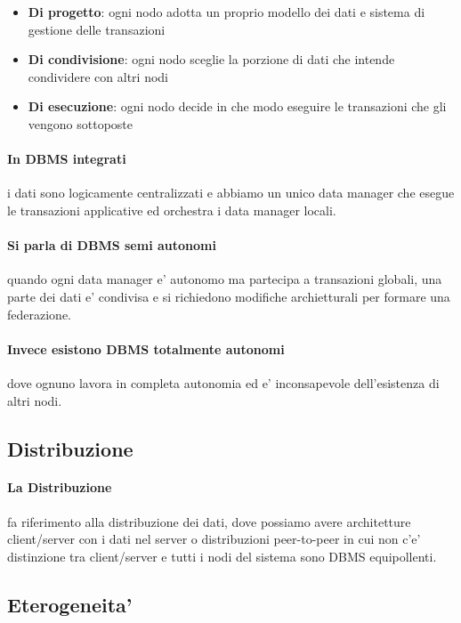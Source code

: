 \begin{itemize}
  \item \textbf{Di progetto}: ogni nodo adotta un proprio modello dei dati e sistema di gestione delle transazioni
  \item \textbf{Di condivisione}: ogni nodo sceglie la porzione di dati che intende condividere con altri nodi
  \item \textbf{Di esecuzione}: ogni nodo decide in che modo eseguire le transazioni che gli vengono sottoposte
\end{itemize}

\paragraph{In DBMS integrati} i dati sono logicamente centralizzati e abbiamo un unico data manager che esegue le transazioni applicative ed orchestra i data manager locali.

\paragraph{Si parla di DBMS semi autonomi} quando ogni data manager e' autonomo ma partecipa a transazioni globali, una parte dei dati e' condivisa e si richiedono modifiche archietturali per formare una federazione.

\paragraph{Invece esistono DBMS totalmente autonomi} dove ognuno lavora in completa autonomia ed e' inconsapevole dell'esistenza di altri nodi.

\subsection{Distribuzione}

\paragraph{La Distribuzione} fa riferimento alla distribuzione dei dati, dove possiamo avere architetture client/server con i dati nel server o distribuzioni peer-to-peer in cui non c'e' distinzione tra client/server e tutti i nodi del sistema sono DBMS equipollenti.

\subsection{Eterogeneita'}

